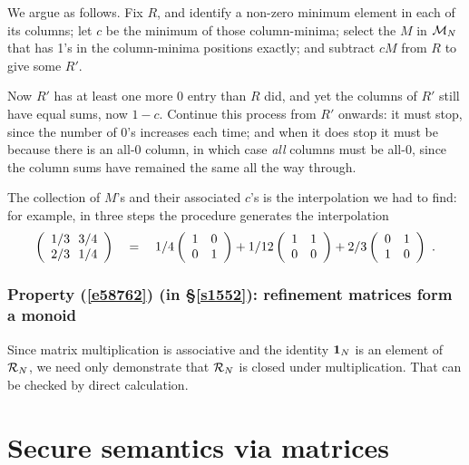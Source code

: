 \documentclass[runningheads]{llncs}
\newcommand\Sec[1] {Sec.~\ref{#1}}
\renewcommand\Sec[1] {\S\ref{#1}}
\newcommand\Eqn[1] {(\ref{#1})}
\newcommand{\RefMatrices}{{\cal R}}
\newcommand{\FinerMatrices}{{\cal M}} \newcommand{\StratMatrices}{{\cal G}}
\newcommand\Wide[1] {~~~#1~~~}
\begin{document}
We argue as follows. Fix $R$, and identify a non-zero minimum element
in each of its columns; let $c$ be the minimum of those column-minima;
select the $M$ in $\FinerMatrices_{N}$ that has 1's in the column-minima
positions exactly; and subtract $c M$ from $R$ to give some $R'$.

Now $R'$ has at least one more 0 entry than $R$ did, and yet the columns of $R'$ still have equal sums, now $1{-}c$. Continue this process from $R'$ onwards: it must stop, since the number of 0's increases each time; and when it does stop it must be because there is an all-0 column, in which case \emph{all} columns must be all-0, since the column sums have remained the same all the way through.\par
The collection of $M$'s and their associated $c$'s is the interpolation we had to find: for example, in three steps the procedure generates the interpolation
\begin{displaymath}
 \left(\begin{array}{c@{~~}c} 1/3 & 3/4 \\ 2/3 & 1/4 \end{array}\right)
 \Wide{=}
   1/4\left(\begin{array}{cc} 1&0\\0&1\end{array}\right)
 + 1/12\left(\begin{array}{cc} 1&1\\0&0\end{array}\right)
 + 2/3\left(\begin{array}{cc} 0&1\\1&0\end{array}\right) ~.
\end{displaymath}

\subsubsection{Property \Eqn{e58762} (in \Sec{s1552}): refinement matrices form a monoid}

Since matrix multiplication is associative and the identity ${\bf 1}_{N}$ is an element of $\RefMatrices_N$, we need only demonstrate that $\RefMatrices_N$ is closed under multiplication. That can be checked by direct calculation.

\section{Secure semantics via matrices} \label{a394759}
\end{document}
